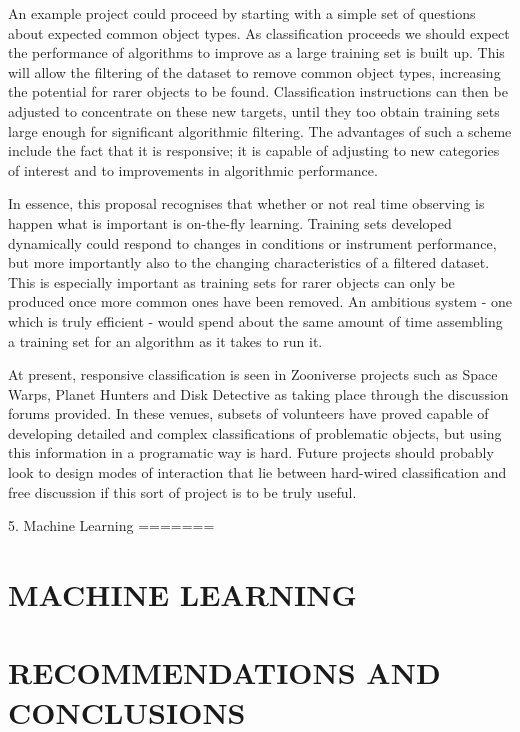 \documentclass{pasa}
\begin{document}
An example project could proceed by starting with a simple set of questions about expected common object types. As classification proceeds we should expect the performance of algorithms to improve as a large training set is built up. This will allow the filtering of the dataset to remove common object types, increasing the potential for rarer objects to be found. Classification instructions can then be adjusted to concentrate on these new targets, until they too obtain training sets large enough for significant algorithmic filtering. The advantages of such a scheme include the fact that it is responsive; it is capable of adjusting to new categories of interest and to improvements in algorithmic performance. 

In essence, this proposal recognises that whether or not real time observing is happen what is important is on-the-fly learning. Training sets developed dynamically could respond to changes in conditions or instrument performance, but more importantly also to the changing characteristics of a filtered dataset. This is especially important as training sets for rarer objects can only be produced once more common ones have been removed. An ambitious system - one which is truly efficient - would spend about the same amount of time assembling a training set for an algorithm as it takes to run it. 

At present, responsive classification is seen in Zooniverse projects such as Space Warps, Planet Hunters and Disk Detective as taking place through the discussion forums provided. In these venues, subsets of volunteers have proved capable of developing detailed and complex classifications of problematic objects, but using this information in a programatic way is hard. Future projects should probably look to design modes of interaction that lie between hard-wired classification and free discussion if this sort of project is to be truly useful. 


5. Machine Learning
=======
\section{MACHINE LEARNING}
\label{sec:ml}

\section{RECOMMENDATIONS AND CONCLUSIONS}
\label{sec:conclusions}
\end{document}
